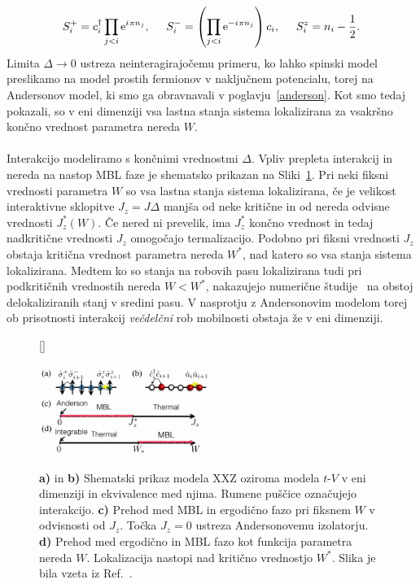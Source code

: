 \begin{equation}\label{eq:Jordan-Wigner}
S_i^+=c^\dagger_i\prod_{j<i}\mathrm{e}^{{i\mkern1mu}\pi n_j}, \hspace{5mm} S_i^-=\left(\prod_{j<i}\mathrm{e}^{-{i\mkern1mu}\pi n_j}\right)c_i,\hspace{5mm} S^z_i= n_i - \frac{1}{2}.
\end{equation}  
Limita $\Delta\to0$ ustreza neinteragirajočemu primeru, ko lahko spinski model preslikamo na model prostih fermionov v naključnem potencialu, torej na Andersonov model, ki smo ga obravnavali v poglavju~\ref{anderson}. Kot smo tedaj pokazali, so v eni dimenziji vsa lastna stanja sistema lokalizirana za vsakršno končno vrednost parametra nereda $W$. \\\\
Interakcijo modeliramo s končnimi vrednostmi $\Delta$. Vpliv prepleta interakcij in nereda na nastop MBL faze je shematsko prikazan na Sliki~\ref{fig:XXZ_t_V}. Pri neki fiksni vrednosti parametra $W$ so vsa lastna stanja sistema lokalizirana, če je velikost interaktivne sklopitve $J_z=J\Delta$ manjša od neke kritične in od nereda odvisne vrednosti $J_z^*(W).$ Če nered ni prevelik, ima $J_z^*$ končno vrednost in tedaj nadkritične vrednosti $J_z$ omogočajo termalizacijo. Podobno pri fiksni vrednosti $J_z$ obstaja kritična vrednost parametra nereda $W^*$, nad katero so vsa stanja sistema lokalizirana. Medtem ko so stanja na robovih pasu lokalizirana tudi pri podkritičnih vrednostih nereda $W<W^*$, nakazujejo numerične študije~\cite{luitz2015many} na obstoj delokaliziranih stanj v sredini pasu. V nasprotju z Andersonovim modelom torej ob prisotnosti interakcij \emph{večdelčni} rob mobilnosti obstaja že v eni dimenziji.  
\begin{figure}[H]
[\FBwidth]
{\caption{\textbf{a)} in \textbf{b)} Shematski prikaz modela XXZ oziroma modela $t$-$V$ v eni dimenziji in ekvivalence med njima. Rumene puščice označujejo interakcijo. \textbf{c)} Prehod med MBL in ergodično fazo pri fiksnem $W$ v odvisnosti od $J_z$. Točka $J_z=0$ ustreza Andersonovemu izolatorju. \textbf{d)} Prehod med ergodično in MBL fazo kot funkcija parametra nereda $W$. Lokalizacija nastopi nad kritično vrednostjo $W^*$. Slika je bila vzeta iz Ref.~\cite{abanin2018ergodicity}. }\label{fig:XXZ_t_V}}
{\includegraphics[width=0.5\textwidth]{scheme_XXZ_t_V.pdf}}
\end{figure} 
